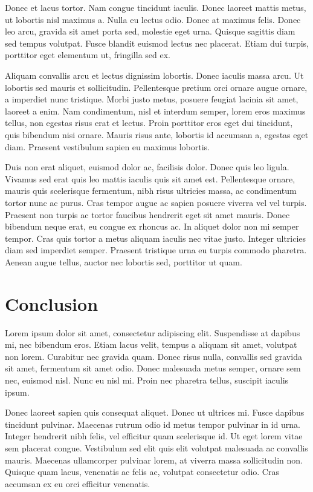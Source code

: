 Donec et lacus tortor. Nam congue tincidunt iaculis. Donec laoreet mattis metus, ut lobortis nisl maximus a. Nulla eu lectus odio. Donec at maximus felis. Donec leo arcu, gravida sit amet porta sed, molestie eget urna. Quisque sagittis diam sed tempus volutpat. Fusce blandit euismod lectus nec placerat. Etiam dui turpis, porttitor eget elementum ut, fringilla sed ex.

Aliquam convallis arcu et lectus dignissim lobortis. Donec iaculis massa arcu. Ut lobortis sed mauris et sollicitudin. Pellentesque pretium orci ornare augue ornare, a imperdiet nunc tristique. Morbi justo metus, posuere feugiat lacinia sit amet, laoreet a enim. Nam condimentum, nisl et interdum semper, lorem eros maximus tellus, non egestas risus erat et lectus. Proin porttitor eros eget dui tincidunt, quis bibendum nisi ornare. Mauris risus ante, lobortis id accumsan a, egestas eget diam. Praesent vestibulum sapien eu maximus lobortis.

Duis non erat aliquet, euismod dolor ac, facilisis dolor. Donec quis leo ligula. Vivamus sed erat quis leo mattis iaculis quis sit amet est. Pellentesque ornare, mauris quis scelerisque fermentum, nibh risus ultricies massa, ac condimentum tortor nunc ac purus. Cras tempor augue ac sapien posuere viverra vel vel turpis. Praesent non turpis ac tortor faucibus hendrerit eget sit amet mauris. Donec bibendum neque erat, eu congue ex rhoncus ac. In aliquet dolor non mi semper tempor. Cras quis tortor a metus aliquam iaculis nec vitae justo. Integer ultricies diam sed imperdiet semper. Praesent tristique urna eu turpis commodo pharetra. Aenean augue tellus, auctor nec lobortis sed, porttitor ut quam.

\section{Conclusion}
Lorem ipsum dolor sit amet, consectetur adipiscing elit. Suspendisse at dapibus mi, nec bibendum eros. Etiam lacus velit, tempus a aliquam sit amet, volutpat non lorem. Curabitur nec gravida quam. Donec risus nulla, convallis sed gravida sit amet, fermentum sit amet odio. Donec malesuada metus semper, ornare sem nec, euismod nisl. Nunc eu nisl mi. Proin nec pharetra tellus, suscipit iaculis ipsum.

Donec laoreet sapien quis consequat aliquet. Donec ut ultrices mi. Fusce dapibus tincidunt pulvinar. Maecenas rutrum odio id metus tempor pulvinar in id urna. Integer hendrerit nibh felis, vel efficitur quam scelerisque id. Ut eget lorem vitae sem placerat congue. Vestibulum sed elit quis elit volutpat malesuada ac convallis mauris. Maecenas ullamcorper pulvinar lorem, at viverra massa sollicitudin non. Quisque quam lacus, venenatis ac felis ac, volutpat consectetur odio. Cras accumsan ex eu orci efficitur venenatis.

